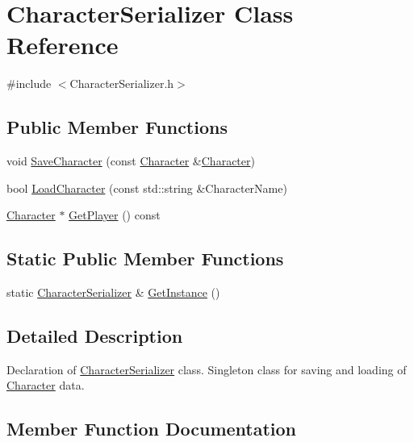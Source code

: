 \hypertarget{class_character_serializer}{}\section{Character\+Serializer Class Reference}
\label{class_character_serializer}


{\ttfamily \#include $<$Character\+Serializer.\+h$>$}

\subsection*{Public Member Functions}
\begin{DoxyCompactItemize}
\item 
void \hyperlink{class_character_serializer_a62575ca321a415f5843c57739e6e7d6a}{Save\+Character} (const \hyperlink{class_character}{Character} \&\hyperlink{class_character}{Character})
\item 
bool \hyperlink{class_character_serializer_a4fb415c79a103f01052a5266747dd00a}{Load\+Character} (const std\+::string \&Character\+Name)
\item 
\hyperlink{class_character}{Character} $\ast$ \hyperlink{class_character_serializer_a7c7ceb1ddb824143b06db85f693ac26c}{Get\+Player} () const 
\end{DoxyCompactItemize}
\subsection*{Static Public Member Functions}
\begin{DoxyCompactItemize}
\item 
static \hyperlink{class_character_serializer}{Character\+Serializer} \& \hyperlink{class_character_serializer_a5a5b282afaf1133b7199c54786adf777}{Get\+Instance} ()
\end{DoxyCompactItemize}


\subsection{Detailed Description}
Declaration of \hyperlink{class_character_serializer}{Character\+Serializer} class. Singleton class for saving and loading of \hyperlink{class_character}{Character} data. 

\subsection{Member Function Documentation}
\hypertarget{class_character_serializer_a5a5b282afaf1133b7199c54786adf777}{}
